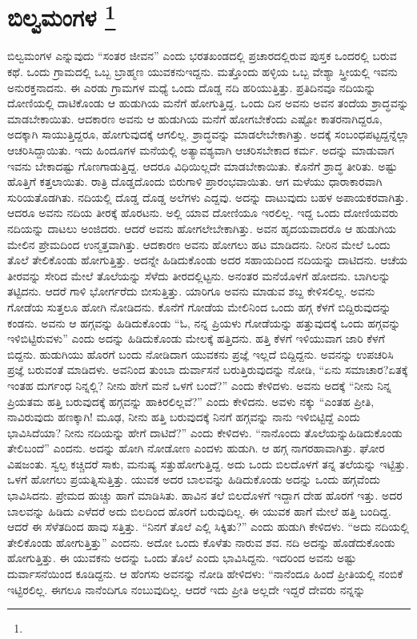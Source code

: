 
\chapter[ಬಿಲ್ವಮಂಗಳ ]{ಬಿಲ್ವಮಂಗಳ \protect\footnote{}}

ಬಿಲ್ವಮಂಗಳ ಎನ್ನುವುದು “ಸಂತರ ಜೀವನ” ಎಂದು ಭರತಖಂಡದಲ್ಲಿ ಪ್ರಚಾರದಲ್ಲಿರುವ ಪುಸ್ತಕ ಒಂದರಲ್ಲಿ ಬರುವ ಕಥೆ. ಒಂದು ಗ್ರಾಮದಲ್ಲಿ ಒಬ್ಬ ಬ್ರಾಹ್ಮಣ ಯುವಕನು\break ಇದ್ದನು. ಮತ್ತೊಂದು ಹಳ್ಳಿಯ ಒಬ್ಬ ವೇಶ್ಯಾ ಸ್ತ್ರೀಯಲ್ಲಿ ಇವನು ಅನುರಕ್ತನಾದನು. ಈ ಎರಡು ಗ್ರಾಮಗಳ ಮಧ್ಯೆ ಒಂದು ದೊಡ್ಡ ನದಿ ಹರಿಯುತ್ತಿತ್ತು. ಪ್ರತಿದಿನವೂ ನದಿಯನ್ನು ದೋಣಿಯಲ್ಲಿ ದಾಟಿಕೊಂಡು ಆ ಹುಡುಗಿಯ ಮನೆಗೆ ಹೋಗುತ್ತಿದ್ದ. ಒಂದು ದಿನ ಅವನು ಅವನ ತಂದೆಯ ಶ್ರಾದ್ಧವನ್ನು ಮಾಡಬೇಕಾಯಿತು. ಆದಕಾರಣ ಅವನು ಆ ಹುಡುಗಿಯ ಮನೆಗೆ ಹೋಗಬೇಕೆಂದು ಎಷ್ಟೋ ಕಾತರನಾಗಿದ್ದರೂ, ಅದಕ್ಕಾಗಿ ಸಾಯುತ್ತಿದ್ದರೂ, ಹೋಗುವುದಕ್ಕೆ ಆಗಲಿಲ್ಲ. ಶ್ರಾದ್ಧವನ್ನು ಮಾಡಲೇಬೇಕಾಗಿತ್ತು. ಅದಕ್ಕೆ ಸಂಬಂಧಪಟ್ಟದ್ದನ್ನೆಲ್ಲಾ ಆಚರಿಸಿದ್ದಾಯಿತು. ಇದು ಹಿಂದೂಗಳ ಮನೆಯಲ್ಲಿ ಅತ್ಯಾವಶ್ಯವಾಗಿ ಆಚರಿಸಬೇಕಾದ ಕರ್ಮ. ಅದನ್ನು ಮಾಡುವಾಗ ಇವನು ಬೇಕಾದಷ್ಟು ಗೊಣಗಾಡು\-ತ್ತಿದ್ದ. ಆದರೂ ವಿಧಿಯಿಲ್ಲದೇ ಮಾಡಬೇಕಾಯಿತು. ಕೊನೆಗೆ ಶ್ರಾದ್ಧ ತೀರಿತು. ಅಷ್ಟು ಹೊತ್ತಿಗೆ ಕತ್ತಲಾಯಿತು. ರಾತ್ರಿ ದೊಡ್ಡದೊಂದು ಬಿರುಗಾಳಿ ಪ್ರಾರಂಭವಾಯಿತು. ಆಗ ಮಳೆಯು ಧಾರಾಕಾರವಾಗಿ ಸುರಿಯತೊಡಗಿತು. ನದಿಯಲ್ಲಿ ದೊಡ್ಡ ದೊಡ್ಡ ಅಲೆಗಳು ಎದ್ದವು. ಅದನ್ನು ದಾಟುವುದು ಬಹಳ ಅಪಾಯಕರವಾಗಿತ್ತು. ಆದರೂ ಅವನು ನದಿಯ ತೀರಕ್ಕೆ ಹೊರಟನು. ಅಲ್ಲಿ ಯಾವ ದೋಣಿಯೂ ಇರಲಿಲ್ಲ. ಇದ್ದ ಒಂದು ದೋಣಿಯವರು ನದಿಯನ್ನು ದಾಟಲು ಅಂಜಿದರು. ಆದರೆ ಅವನು ಹೋಗಲೇಬೇಕಾಗಿತ್ತು. ಅವನ ಹೃದಯವಾದರೊ ಆ ಹುಡುಗಿಯ ಮೇಲಿನ ಪ್ರೇಮದಿಂದ ಉನ್ಮತ್ತವಾಗಿತ್ತು. ಆದಕಾರಣ ಅವನು ಹೋಗಲು ಹಟ ಮಾಡಿದನು. ನೀರಿನ ಮೇಲೆ ಒಂದು ತೊಲೆ ತೇಲಿಕೊಂಡು ಹೋಗುತ್ತಿತ್ತು. ಅದನ್ನೇ ಹಿಡಿದುಕೊಂಡು ಅದರ ಸಹಾಯದಿಂದ ನದಿಯನ್ನು ದಾಟಿದನು. ಆಚೆಯ ತೀರವನ್ನು ಸೇರಿದ ಮೇಲೆ ತೊಲೆಯನ್ನು ಸೆಳೆದು ತೀರದಲ್ಲಿಟ್ಟನು. ಅನಂತರ ಮನೆಯೊಳಗೆ ಹೋದನು. ಬಾಗಿಲನ್ನು ತಟ್ಟಿದನು. ಆದರೆ ಗಾಳಿ ಭೋರ್ಗರೆದು ಬೀಸುತ್ತಿತ್ತು. ಯಾರಿಗೂ ಅವನು ಮಾಡುವ ಶಬ್ದ ಕೇಳಿಸಲಿಲ್ಲ. ಅವನು ಗೋಡೆಯ ಸುತ್ತಲೂ ಹೋಗಿ ನೋಡಿದನು. ಕೊನೆಗೆ ಗೋಡೆಯ ಮೇಲಿನಿಂದ ಒಂದು ಹಗ್ಗ ಕೆಳಗೆ ಬಿದ್ದಿರುವುದನ್ನು ಕಂಡನು. ಅವನು ಆ ಹಗ್ಗವನ್ನು ಹಿಡಿದುಕೊಂಡು “ಓ, ನನ್ನ ಪ್ರಿಯಳು ಗೋಡೆಯನ್ನು ಹತ್ತುವುದಕ್ಕೆ ಒಂದು ಹಗ್ಗವನ್ನು ಇಳಿಬಿಟ್ಟಿರುವಳು” ಎಂದು ಅದನ್ನು ಹಿಡಿದುಕೊಂಡು ಮೇಲಕ್ಕೆ ಹತ್ತಿದನು. ಹತ್ತಿ ಕೆಳಗೆ ಇಳಿಯು\-ವಾಗ ಜಾರಿ ಕೆಳಗೆ ಬಿದ್ದನು. ಹುಡುಗಿಯು ಹೊರಗೆ ಬಂದು ನೋಡಿದಾಗ ಯುವಕನು ಪ್ರಜ್ಞೆ ಇಲ್ಲದೆ ಬಿದ್ದಿದ್ದನು. ಅವನನ್ನು ಉಪಚರಿಸಿ ಪ್ರಜ್ಞೆ ಬರುವಂತೆ ಮಾಡಿದಳು. ಅವನಿಂದ ತುಂಬಾ ದುರ್ವಾಸನೆ ಬರುತ್ತಿರುವುದನ್ನು ನೋಡಿ, “ಏನು ಸಮಾಚಾರ?\break ಏತಕ್ಕೆ ಇಂತಹ ದುರ್ಗಂಧ ನಿನ್ನಲ್ಲಿ? ನೀನು ಹೇಗೆ ಮನೆ ಒಳಗೆ ಬಂದೆ?” ಎಂದು ಕೇಳಿದಳು. ಅವನು ಅದಕ್ಕೆ “ನೀನು ನಿನ್ನ ಪ್ರಿಯತಮ ಹತ್ತಿ ಬರುವುದಕ್ಕೆ ಹಗ್ಗವನ್ನು ಹಾಕಿರಲಿಲ್ಲವೆ?” ಎಂದು ಕೇಳಿದನು. ಅವಳು ನಕ್ಕು “ಎಂತಹ ಪ್ರೀತಿ, ನಾವಿರುವುದು ಹಣಕ್ಕಾಗಿ! ಮೂಢ, ನೀನು ಹತ್ತಿ ಬರುವುದಕ್ಕೆ ನಿನಗೆ ಹಗ್ಗವನ್ನು ನಾನು ಇಳಿಬಿಟ್ಟಿದ್ದೆ ಎಂದು ಭಾವಿಸಿದೆಯಾ? ನೀನು ನದಿಯನ್ನು ಹೇಗೆ ದಾಟಿದೆ?” ಎಂದು ಕೇಳಿದಳು. “ನಾನೊಂದು ತೊಲೆಯನ್ನು\break ಹಿಡಿದುಕೊಂಡು ತೇಲಿಬಂದೆ” ಎಂದನು. ಅದನ್ನು ಹೋಗಿ ನೋಡೋಣ ಎಂದಳು ಹುಡುಗಿ. ಆ ಹಗ್ಗ ನಾಗರಹಾವಾಗಿತ್ತು. ಘೋರ ವಿಷಜಂತು. ಸ್ವಲ್ಪ ಕಚ್ಚಿದರೆ ಸಾಕು, ಮನುಷ್ಯ ಸತ್ತುಹೋಗುತ್ತಿದ್ದ. ಅದು ಒಂದು ಬಿಲದೊಳಗೆ ತನ್ನ ತಲೆಯನ್ನು ಇಟ್ಟಿತ್ತು. ಒಳಗೆ ಹೋಗಲು ಪ್ರಯತ್ನಿಸುತ್ತಿತ್ತು. ಯುವಕ ಅದರ ಬಾಲವನ್ನು ಹಿಡಿದುಕೊಂಡು ಅದನ್ನು ಒಂದು ಹಗ್ಗವೆಂದು ಭಾವಿಸಿದನು. ಪ್ರೇಮದ ಹುಚ್ಚು ಹಾಗೆ ಮಾಡಿಸಿತು. ಹಾವಿನ ತಲೆ ಬಿಲದೊಳಗೆ ಇದ್ದಾಗ ದೇಹ ಹೊರಗೆ ಇತ್ತು. ಅದರ ಬಾಲವನ್ನು ಹಿಡಿದು ಎಳೆದರೆ ಅದು ಬಿಲದಿಂದ ಹೊರಗೆ ಬರುವುದಿಲ್ಲ. ಈ ಯುವಕ ಹಾಗೆ ಮೇಲೆ ಹತ್ತಿ ಬಂದಿದ್ದ. ಆದರೆ ಈ ಸೆಳೆತದಿಂದ ಹಾವು ಸತ್ತಿತ್ತು. “ನಿನಗೆ ತೊಲೆ ಎಲ್ಲಿ ಸಿಕ್ಕಿತು?” ಎಂದು ಹುಡುಗಿ ಕೇಳಿದಳು. “ಅದು ನದಿಯಲ್ಲಿ ತೇಲಿಕೊಂಡು ಹೋಗುತ್ತಿತ್ತು” ಎಂದನು. ಅದೋ ಒಂದು ಕೊಳೆತು ನಾರುವ ಶವ. ನದಿ ಅದನ್ನು ಹೊಡೆದುಕೊಂಡು ಹೋಗುತ್ತಿತ್ತು. ಈ ಯುವಕನು ಅದನ್ನು ಒಂದು ತೊಲೆ ಎಂದು ಭಾವಿಸಿದ್ದನು. ಇದರಿಂದ ಅವನು ಅಷ್ಟು ದುರ್ವಾಸನೆಯಿಂದ ಕೂಡಿದ್ದನು. ಆ ಹೆಂಗಸು ಅವನನ್ನು ನೋಡಿ ಹೇಳಿದಳು: “ನಾನೆಂದೂ ಹಿಂದೆ ಪ್ರೀತಿಯಲ್ಲಿ ನಂಬಿಕೆ ಇಟ್ಟಿರಲಿಲ್ಲ. ಈಗಲೂ ನಾನೆಂದಿಗೂ ನಂಬುವುದಿಲ್ಲ. ಆದರೆ ಇದು ಪ್ರೀತಿ ಅಲ್ಲದೇ ಇದ್ದರೆ ದೇವರು ನನ್ನನ್ನು 